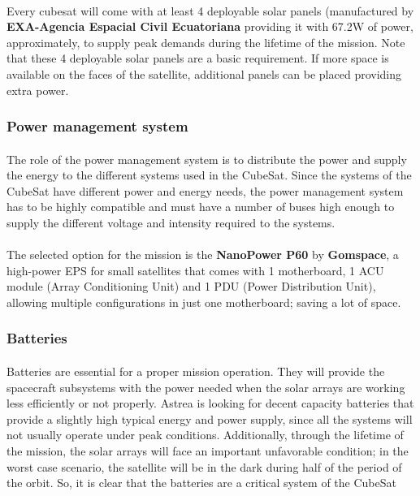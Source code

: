 \paragraph{}Every cubesat will come with at least 4 deployable solar panels (manufactured by \textbf{EXA-Agencia Espacial Civil Ecuatoriana} providing it with 67.2W of power, approximately, to supply peak demands during the lifetime of the mission. Note that these 4 deployable solar panels are a basic requirement. If more space is available on the faces of the satellite, additional panels can be placed providing extra power.

\subsubsection{Power management system}

\paragraph{}The role of the power management system is to distribute the power and supply the energy to the different systems used in the CubeSat. Since the systems of the CubeSat have different power and energy needs, the power management system has to be highly compatible and must have a number of buses high enough to supply the different voltage and intensity required to the systems.

\paragraph{}The selected option for the mission is the \textbf{NanoPower P60} by \textbf{Gomspace}, a high-power EPS for small satellites that comes with 1 motherboard, 1 ACU module (Array Conditioning Unit) and 1 PDU (Power Distribution Unit), allowing multiple configurations in just one motherboard; saving a lot of space.


\subsubsection{Batteries}

\paragraph{}	Batteries are essential for a proper mission operation. They will provide the spacecraft subsystems with the power needed when the solar arrays are working less efficiently or not properly. Astrea is looking for decent capacity batteries that provide a slightly high typical energy and power supply, since all the systems will not usually operate under peak conditions. Additionally, through the lifetime of the mission, the solar arrays will face an important unfavorable condition; in the worst case scenario, the satellite will be in the dark during half of the period of the orbit. So, it is clear that the batteries are a critical system of the CubeSat

